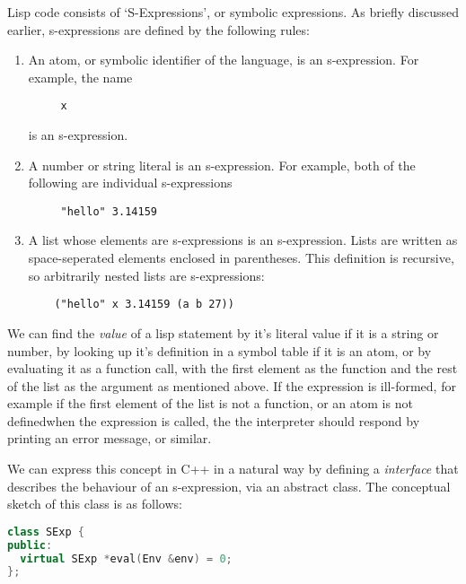 \documentclass[12pt]{article}
\begin{document}
Lisp code consists of `S-Expressions', or symbolic expressions. As briefly discussed earlier, s-expressions are defined by the following rules: 
\begin{enumerate} 
	\item An atom, or symbolic identifier of the language, is an s-expression. For example, the name
	\begin{lstlisting}
	 x 
	\end{lstlisting}
		is an s-expression.
	\item A number or string literal is an s-expression. For example, both of the following are individual s-expressions
	\begin{lstlisting}
	 "hello" 3.14159
	\end{lstlisting}
	\item A list whose elements are s-expressions is an s-expression. Lists are written as space-seperated elements enclosed in parentheses. This definition is 
		recursive, so arbitrarily nested lists are s-expressions: 
	\begin{lstlisting}
	("hello" x 3.14159 (a b 27))
	\end{lstlisting} 
\end{enumerate}
We can find the \textit{value} of a lisp statement by it's literal value if it is a string or number, by looking up it's definition in a symbol 
table if it is an atom, or by evaluating it as a function call, with the first element as the function and the rest of the list as the argument as mentioned above. If the expression
is ill-formed, for example if the first element of the list is not a function, or an atom is not definedwhen the expression is called, the the interpreter should respond by 
printing an error message, or similar. 

We can express this concept in C++ in a natural way by defining a \textit{interface} that describes the behaviour of an s-expression, via an abstract class. The conceptual 
sketch of this class is as follows: 
\begin{lstlisting}[language=C++]
class SExp {
public:
  virtual SExp *eval(Env &env) = 0;
};
\end{lstlisting}
\end{document}
